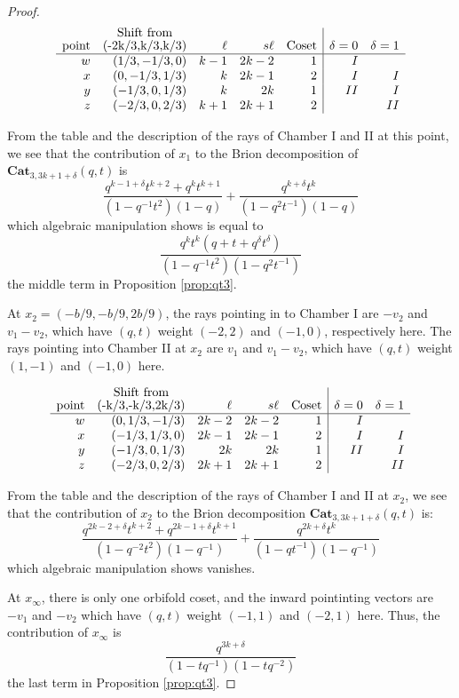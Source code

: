 \documentclass{amsart}[12pt]
\theoremstyle{definition}
\newcommand{\Cat}{\mathbf{Cat}}
\newcommand{\sk}{s\ell}
\begin{document}
\begin{proof}
$$
\begin{array}{rrrrr|rr}
\text{point} & \shortstack{ \text{Shift from}\\ (-2k/3,k/3,k/3)} & \ell & \sk & \text{Coset} & \delta=0  &\delta=1  \\
\hline
w  & (1/3, -1/3, 0) & k-1 & 2k-2 & 1 & I & \\
x  & (0, -1/3, 1/3) & k &2k-1 & 2 & I & I \\ 
y & (-1/3, 0, 1/3) & k &2k & 1 & II & I \\
z & (-2/3, 0, 2/3) & k+1 & 2k+1 & 2 &   & II 
\end{array}
$$

From the table and the description of the rays of Chamber I and II at this point, we see that the contribution of $x_1$ to the Brion decomposition of $\Cat_{3,3k+1+\delta}(q,t)$ is 
$$\frac{q^{k-1+\delta}t^{k+2}+q^kt^{k+1}}{(1-q^{-1}t^2)(1-q)}+\frac{q^{k+\delta}t^k}{(1-q^2t^{-1})(1-q)}$$
which algebraic manipulation shows is equal to
$$\frac{q^kt^k(q+t+q^\delta t^\delta)}{(1-q^{-1}t^2)(1-q^2t^{-1})}$$
the middle term in Proposition \ref{prop:qt3}.


At $x_2=(-b/9, -b/9, 2b/9)$, the rays pointing in to Chamber I are $-v_2$ and $v_1-v_2$, which have $(q,t)$ weight $(-2, 2)$ and $(-1, 0)$, respectively here.  The rays pointing into Chamber II at $x_2$ are $v_1$ and $v_1-v_2$, which have $(q,t)$ weight $(1,-1)$ and $(-1,0)$ here.

$$
\begin{array}{rrrrr|rr}
\text{point} & \shortstack{ \text{Shift from}\\ (-k/3,-k/3,2k/3)} & \ell & \sk & \text{Coset} & \delta=0  &\delta=1  \\
\hline
w  & (0, 1/3, -1/3) & 2k-2 & 2k-2 & 1 & I & \\
x  & (-1/3, 1/3, 0) & 2k-1 &2k-1 & 2 & I & I \\ 
y & (-1/3, 0, 1/3) & 2k &2k & 1 & II & I \\
z & (-2/3, 0, 2/3) & 2k+1 & 2k+1 & 2 &   & II 
\end{array}
$$

From the table and the description of the rays of Chamber I and II at $x_2$, we see that the contribution of $x_2$ to the Brion decomposition $\Cat_{3, 3k+1+\delta}(q,t)$ is:
$$\frac{q^{2k-2+\delta}t^{k+2}+q^{2k-1+\delta}t^{k+1}}{(1-q^{-2}t^2)(1-q^{-1})}+\frac{q^{2k+\delta}t^k}{(1-qt^{-1})(1-q^{-1})}$$
which algebraic manipulation shows vanishes.


At $x_\infty$, there is only one orbifold coset, and the inward pointinting vectors are $-v_1$ and $-v_2$ which have $(q,t)$ weight $(-1,1)$ and $(-2,1)$ here.  Thus, the contribution of $x_\infty$ is 
$$\frac{q^{3k+\delta}}{(1-tq^{-1})(1-tq^{-2})}$$
the last term in Proposition \ref{prop:qt3}.




\end{proof}
\end{document}

